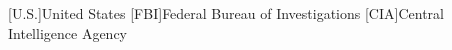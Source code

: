 


[U.S.]{United States}
[FBI]{Federal Bureau of Investigations}
[CIA]{Central Intelligence Agency}

\renewcommand{\NPSacrocommon}{
}
\NPSacrocommon{}



